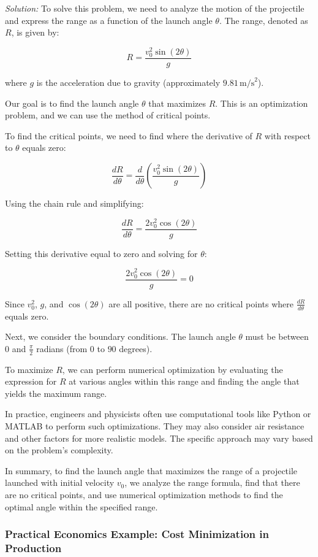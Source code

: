\documentclass[a4paper,12pt]{book}
\newcounter{problem}
\newenvironment{solution}[1][]
{\par\noindent\textit{Solution:} \rmfamily}{\medskip}
\begin{document}
\begin{solution}
To solve this problem, we need to analyze the motion of the projectile and express the range as a function of the launch angle $\theta$. The range, denoted as $R$, is given by:

\[
R = \frac{v_0^2 \sin(2\theta)}{g}
\]

where $g$ is the acceleration due to gravity (approximately $9.81 \, \text{m/s}^2$).

Our goal is to find the launch angle $\theta$ that maximizes $R$. This is an optimization problem, and we can use the method of critical points.

To find the critical points, we need to find where the derivative of $R$ with respect to $\theta$ equals zero:

\[
\frac{dR}{d\theta} = \frac{d}{d\theta}\left(\frac{v_0^2 \sin(2\theta)}{g}\right)
\]

Using the chain rule and simplifying:

\[
\frac{dR}{d\theta} = \frac{2v_0^2 \cos(2\theta)}{g}
\]

Setting this derivative equal to zero and solving for $\theta$:

\[
\frac{2v_0^2 \cos(2\theta)}{g} = 0
\]

Since $v_0^2$, $g$, and $\cos(2\theta)$ are all positive, there are no critical points where $\frac{dR}{d\theta}$ equals zero.

Next, we consider the boundary conditions. The launch angle $\theta$ must be between $0$ and $\frac{\pi}{2}$ radians (from $0$ to $90$ degrees).

To maximize $R$, we can perform numerical optimization by evaluating the expression for $R$ at various angles within this range and finding the angle that yields the maximum range.

In practice, engineers and physicists often use computational tools like Python or MATLAB to perform such optimizations. They may also consider air resistance and other factors for more realistic models. The specific approach may vary based on the problem's complexity.

In summary, to find the launch angle that maximizes the range of a projectile launched with initial velocity $v_0$, we analyze the range formula, find that there are no critical points, and use numerical optimization methods to find the optimal angle within the specified range.
\end{solution}


\subsubsection*{Practical Economics Example: Cost Minimization in Production}
\end{document}
